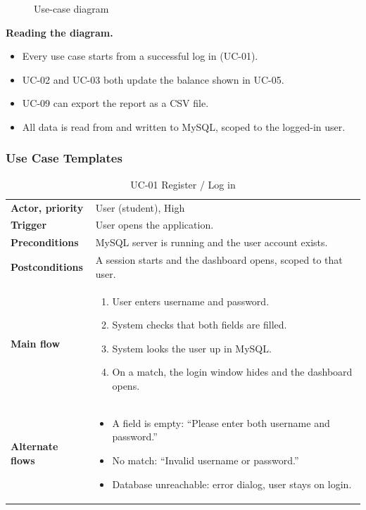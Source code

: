 \documentclass[12pt,a4paper]{article}
\makeatletter
\newcommand{\usecase}[7]{%
  \begin{table}[H]
  \centering
  \caption{#1}
  \begin{tabularx}{\textwidth}{@{}>{\bfseries}p{3.2cm}X@{}}
    \toprule
    Actor, priority & #2 \\
    Trigger & #3 \\
    Preconditions & #4 \\
    Postconditions & #5 \\
    \midrule
    Main flow & \begin{enumerate}[label=\arabic*.]#6\end{enumerate} \\
    \midrule
    Alternate flows & \begin{itemize}#7\end{itemize} \\
    \bottomrule
  \end{tabularx}
  \end{table}}
\makeatother
\begin{document}
\begin{figure}[H]
\centering
{}
\caption{Use-case diagram}
\end{figure}

\textbf{Reading the diagram.}
\begin{itemize}
  \item Every use case starts from a successful log in (UC-01).
  \item UC-02 and UC-03 both update the balance shown in UC-05.
  \item UC-09 can export the report as a CSV file.
  \item All data is read from and written to MySQL, scoped to the logged-in user.
\end{itemize}

\subsubsection{Use Case Templates}

\usecase{UC-01 Register / Log in}
  {User (student), High}
  {User opens the application.}
  {MySQL server is running and the user account exists.}
  {A session starts and the dashboard opens, scoped to that user.}
  {\item User enters username and password.
   \item System checks that both fields are filled.
   \item System looks the user up in MySQL.
   \item On a match, the login window hides and the dashboard opens.}
  {\item A field is empty: ``Please enter both username and password.''
   \item No match: ``Invalid username or password.''
   \item Database unreachable: error dialog, user stays on login.}
\end{document}
